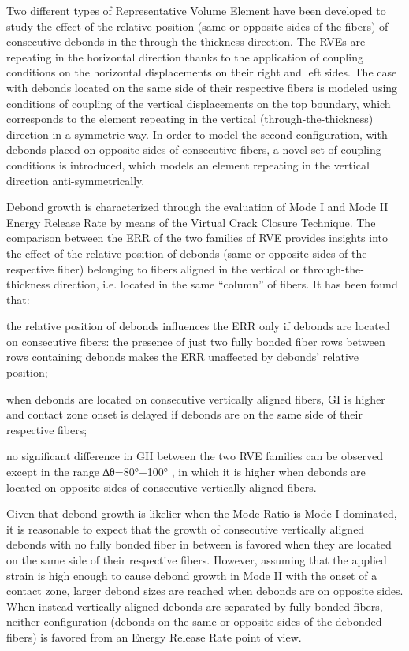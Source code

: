 Two different types of Representative Volume Element have been developed to study the effect of the relative position (same or opposite sides of the fibers) of consecutive debonds in the through-the thickness direction. The RVEs are repeating in the horizontal direction thanks to the application of coupling conditions on the horizontal displacements on their right and left sides. The case with debonds located on the same side of their respective fibers is modeled using conditions of coupling of the vertical displacements on the top boundary, which corresponds to the element repeating in the vertical (through-the-thickness) direction in a symmetric way. In order to model the second configuration, with debonds placed on opposite sides of consecutive fibers, a novel set of coupling conditions is introduced, which models an element repeating in the vertical direction anti-symmetrically. 

Debond growth is characterized through the evaluation of Mode I and Mode II Energy Release Rate by means of the Virtual Crack Closure Technique. The comparison between the ERR of the two families of RVE provides insights into the effect of the relative position of debonds (same or opposite sides of the respective fiber) belonging to fibers aligned in the vertical or through-the-thickness direction, i.e. located in the same “column” of fibers. It has been found that: 

the relative position of debonds influences the ERR only if debonds are located on consecutive fibers: the presence of just two fully bonded fiber rows between rows containing debonds makes the ERR unaffected by debonds’ relative position; 

when debonds are located on consecutive vertically aligned fibers, 
GI
 is higher and contact zone onset is delayed if debonds are on the same side of their respective fibers; 

no significant difference in 
GII
 between the two RVE families can be observed except in the range 
∆θ=80°−100°
, in which it is higher when debonds are located on opposite sides of consecutive vertically aligned fibers. 

Given that debond growth is likelier when the Mode Ratio is Mode I dominated, it is reasonable to expect that the growth of consecutive vertically aligned debonds with no fully bonded fiber in between is favored when they are located on the same side of their respective fibers. However, assuming that the applied strain is high enough to cause debond growth in Mode II with the onset of a contact zone, larger debond sizes are reached when debonds are on opposite sides. When instead vertically-aligned debonds are separated by fully bonded fibers, neither configuration (debonds on the same or opposite sides of the debonded fibers) is favored from an Energy Release Rate point of view. 

